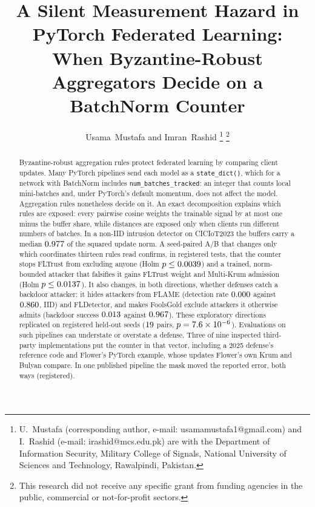\documentclass[journal]{IEEEtran}
\begin{document}
\title{A Silent Measurement Hazard in PyTorch Federated Learning: When
Byzantine-Robust Aggregators Decide on a BatchNorm Counter}

\author{Usama~Mustafa and Imran~Rashid%
\thanks{U.~Mustafa (corresponding author, e-mail: usamamustafa1@gmail.com) and
I.~Rashid (e-mail: irashid@mcs.edu.pk) are with the Department of Information
Security, Military College of Signals, National University of Sciences and
Technology, Rawalpindi, Pakistan.}%
\thanks{This research did not receive any specific grant from funding agencies in
the public, commercial or not-for-profit sectors.}}

\maketitle

\begin{abstract}
Byzantine-robust aggregation rules protect federated learning by comparing client updates. Many PyTorch pipelines send each model as a \texttt{state\_dict()},
which for a network with BatchNorm includes \texttt{num\_batches\_tracked}: an integer
that counts local mini-batches and, under PyTorch's default momentum, does not affect the
model. Aggregation rules nonetheless decide on it. An exact decomposition explains which rules are exposed: every pairwise cosine
weights the trainable signal by at most one minus the buffer share,
while distances are exposed only when clients run different numbers of batches. In a
non-IID intrusion detector on CICIoT2023 the buffers carry a median
$0.977$ of the squared update norm. A seed-paired A/B that changes only
which coordinates thirteen rules read confirms, in registered tests, that the
counter stops FLTrust from excluding anyone (Holm $p\le0.0039$) and a
trained, norm-bounded attacker that falsifies it gains FLTrust weight and Multi-Krum
admission (Holm $p\le0.0137$). It also changes, in both directions, whether
defenses catch a backdoor attacker: it hides attackers from FLAME (detection rate
$0.000$ against $0.860$, IID) and FLDetector, and makes FoolsGold
exclude attackers it otherwise admits (backdoor success $0.013$
against $0.967$). These exploratory directions replicated on
registered held-out seeds ($19$ pairs, $p=7.6\times10^{-6}$). Evaluations on
such pipelines can understate or overstate a defense.
Three of nine inspected third-party implementations put the counter in that vector,
including a 2025 defense's reference code and Flower's PyTorch example, whose updates
Flower's own Krum and Bulyan compare. In one published pipeline the mask moved the
reported error, both ways (registered).
\end{abstract}
\end{document}
